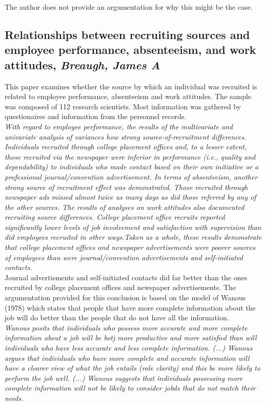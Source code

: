 \documentclass[a4paper, 11pt]{article} %
\begin{document}
The author does not provide an argumentation for why this might be the case.

\subsection*{Relationships between recruiting sources and employee performance, absenteeism, and work attitudes, \emph{Breaugh, James A} \cite{eight}}

This paper examines whether the source by which an individual was recruited is related to employee performance, absenteeism and work attitudes. The sample was composed of 112 research scientists. Most information was gathered by questionaires and information from the personnel records. \\

\emph{With regard to employee performance, the results of the multivariate
and univariate analysis of variances how strong source-of-recruitment differences.
Individuals recruited through college placement offices and, to a
lesser extent, those recruited via the newspaper were inferior in performance
(i.e., quality and dependability) to individuals who made contact
based on their own initiative or a professional journal/convention advertisement.
In terms of absenteeism, another strong source of recruitment
effect was demonstrated. Those recruited through newspaper ads missed
almost twice as many days as did those referred by any of the other
sources. The results of analyses on work attitudes also documented recruiting
source differences. College placement office recruits reported significantly
lower levels of job involvement and satisfaction with supervision
than did employees recruited in other ways.Taken as a whole, these
results demonstrate that college placement offices and newspaper advertisements
were poorer sources of employees than were journal/convention
advertisements and self-initiated contacts.} \\

Journal advertisments and self-initiated contacts did far better than the ones recruited by college placement offices and newspaper advertisements. The argumentation provided for this conclusion is based on the model of Wanous (1978) which states that people that have more complete information about the job will do better than the people that do not have all the information. \\

\emph{Wanous posits that individuals who possess more accurate and
more complete information about a job will be botj more productive and more satisfied than will individuals who have less accurate and less complete information. (...) 
Wanous argues that individuals who have more complete and accurate information
will have a clearer view of what the job entails (role clarity) and this be more likely to perform the job well. (...) Wanous suggests that individuals possessing more complete information will not be likely to consider jobds that do not match their needs.}
\end{document}
